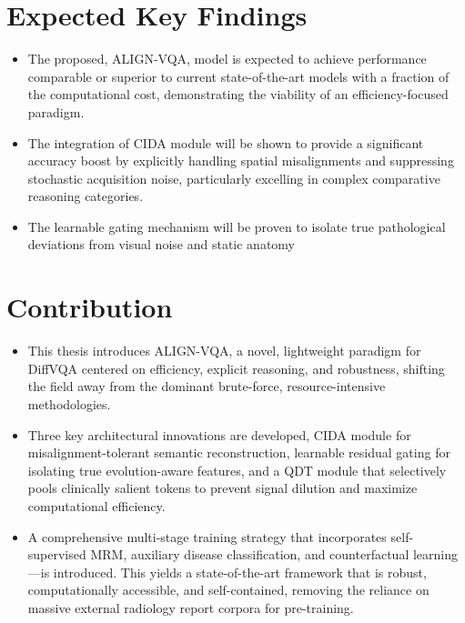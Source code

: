 \section{Expected Key Findings}
\begin{itemize}
	\item The proposed, ALIGN-VQA, model is expected to achieve performance comparable or superior to current state-of-the-art models with a fraction of the computational cost, demonstrating the viability of an efficiency-focused paradigm.
	
	\item The integration of CIDA module will be shown to provide a significant accuracy boost by explicitly handling spatial misalignments and suppressing stochastic acquisition noise, particularly excelling in complex comparative reasoning categories.
	
	\item The learnable gating mechanism will be proven to isolate true pathological deviations from visual noise and static anatomy
\end{itemize}

\section{Contribution}
\begin{itemize}
	\item This thesis introduces ALIGN-VQA, a novel, lightweight paradigm for DiffVQA centered on efficiency, explicit reasoning, and robustness, shifting the field away from the dominant brute-force, resource-intensive methodologies.
	\item Three key architectural innovations are developed, CIDA module for misalignment-tolerant semantic reconstruction, learnable residual gating for isolating true evolution-aware features, and a QDT module that selectively pools clinically salient tokens to prevent signal dilution and maximize computational efficiency.
	\item A comprehensive multi-stage training strategy that incorporates self-supervised MRM, auxiliary disease classification, and counterfactual learning—is introduced. This yields a state-of-the-art framework that is robust, computationally accessible, and self-contained, removing the reliance on massive external radiology report corpora for pre-training.
\end{itemize}